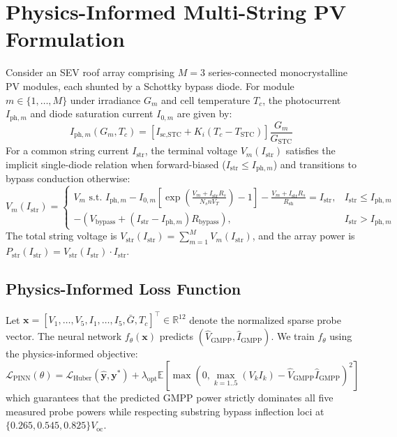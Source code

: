 \documentclass[final,3p,times,twocolumn]{elsarticle}
\begin{document}
\section{Physics-Informed Multi-String PV Formulation}
Consider an SEV roof array comprising $M=3$ series-connected monocrystalline PV modules, each shunted by a Schottky bypass diode. For module $m \in \{1,\dots,M\}$ under irradiance $G_m$ and cell temperature $T_c$, the photocurrent $I_{\text{ph},m}$ and diode saturation current $I_{0,m}$ are given by:
\begin{equation}
I_{\text{ph},m}(G_m, T_c) = \left[ I_{\text{sc,STC}} + K_i (T_c - T_{\text{STC}}) \right] \frac{G_m}{G_{\text{STC}}}
\end{equation}
For a common string current $I_{\text{str}}$, the terminal voltage $V_m(I_{\text{str}})$ satisfies the implicit single-diode relation when forward-biased ($I_{\text{str}} \le I_{\text{ph},m}$) and transitions to bypass conduction otherwise:
\begin{equation}
V_m(I_{\text{str}}) = \begin{cases}
V_m \text{ s.t. } I_{\text{ph},m} - I_{0,m}\left[\exp\left(\frac{V_m + I_{\text{str}}R_s}{N_s n V_T}\right)-1\right] - \frac{V_m + I_{\text{str}}R_s}{R_{\text{sh}}} = I_{\text{str}}, & I_{\text{str}} \le I_{\text{ph},m} \\
-\left(V_{\text{bypass}} + (I_{\text{str}} - I_{\text{ph},m})R_{\text{bypass}}\right), & I_{\text{str}} > I_{\text{ph},m}
\end{cases}
\end{equation}
The total string voltage is $V_{\text{str}}(I_{\text{str}}) = \sum_{m=1}^{M} V_m(I_{\text{str}})$, and the array power is $P_{\text{str}}(I_{\text{str}}) = V_{\text{str}}(I_{\text{str}}) \cdot I_{\text{str}}$.

\subsection{Physics-Informed Loss Function}
Let $\mathbf{x} = [V_1,\dots,V_5, I_1,\dots,I_5, \bar{G}, T_c]^\top \in \mathbb{R}^{12}$ denote the normalized sparse probe vector. The neural network $f_\theta(\mathbf{x})$ predicts $(\hat{V}_{\text{GMPP}}, \hat{I}_{\text{GMPP}})$. We train $f_\theta$ using the physics-informed objective:
\begin{equation}
\mathcal{L}_{\text{PINN}}(\theta) = \mathcal{L}_{\text{Huber}}(\hat{\mathbf{y}}, \mathbf{y}^*) + \lambda_{\text{opt}} \mathbb{E}\left[ \max\left(0, \max_{k=1..5}(V_k I_k) - \hat{V}_{\text{GMPP}}\hat{I}_{\text{GMPP}}\right)^2 \right]
\end{equation}
which guarantees that the predicted GMPP power strictly dominates all five measured probe powers while respecting substring bypass inflection loci at $\{0.265, 0.545, 0.825\}V_{\text{oc}}$.
\end{document}
